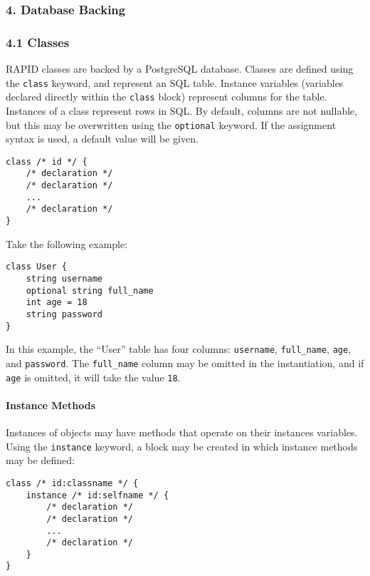 \subsubsection{4. Database Backing}\label{database-backing}

\subsubsection{4.1 Classes}\label{classes}

RAPID classes are backed by a PostgreSQL database. Classes are defined
using the \texttt{class} keyword, and represent an SQL table. Instance
variables (variables declared directly within the \texttt{class} block)
represent columns for the table. Instances of a class represent rows in
SQL. By default, columns are not nullable, but this may be overwritten
using the \texttt{optional} keyword. If the assignment syntax is used, a
default value will be given.

\begin{verbatim}
class /* id */ {
    /* declaration */
    /* declaration */
    ...
    /* declaration */
}
\end{verbatim}

Take the following example:

\begin{verbatim}
class User {
    string username
    optional string full_name
    int age = 18
    string password
}
\end{verbatim}

In this example, the ``User'' table has four columns: \texttt{username},
\texttt{full\_name}, \texttt{age}, and \texttt{password}. The
\texttt{full\_name} column may be omitted in the instantiation, and if
\texttt{age} is omitted, it will take the value \texttt{18}.

\paragraph{Instance Methods}\label{instance-methods}

Instances of objects may have methods that operate on their instances
variables. Using the \texttt{instance} keyword, a block may be created
in which instance methods may be defined:

\begin{verbatim}
class /* id:classname */ {
    instance /* id:selfname */ {
        /* declaration */
        /* declaration */
        ...
        /* declaration */
    }
}
\end{verbatim}

